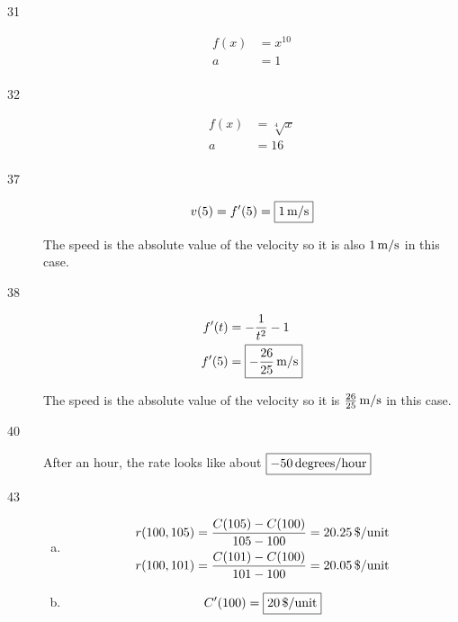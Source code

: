 \documentclass[letterpaper, landscape]{exam}
\begin{document}
\begin{description}
      \item[31]
        \begin{align*}
          f(x) & = x^{10} \\
          a    & = 1 \\
        \end{align*}

      \item[32]
        \begin{align*}
          f(x) & = \sqrt[4]{x} \\
          a    & = 16 \\
        \end{align*}

      \item[37]
        \[
          v(5) = f'(5) = \boxed{\unit[1]{m/s}} 
        \]

        The speed is the absolute value of the velocity so it is also $\unit[1]{m/s}$ in this case.

      \item[38]
        \begin{align*}
          f'(t) & = - \frac{1}{t^2} - 1 \\
          f'(5) & = \boxed{ \unit[ - \frac{26}{25} ]{m/s} }
        \end{align*}

        The speed is the absolute value of the velocity so it is $\unit[\frac{26}{25} ]{m/s}$ in this case.
 
      \item[40]
        After an hour, the rate looks like about $\boxed{ - \unit[50]{degrees/hour} }$

      \newpage

      \item[43]
        \begin{enumerate}[(a)]
          \item 
            \begin{align*}
              r(100, 105) &= \frac{ C(105) - C(100) }{ 105 - 100 } = \unit[20.25]{\$/unit} \\
              r(100, 101) &= \frac{ C(101) - C(100) }{ 101 - 100 } = \unit[20.05]{\$/unit} \\
            \end{align*}

          \item
            \[
              C'(100) = \boxed{ \unit[20]{\$/unit} }
            \]
        \end{enumerate}


\end{description}
\end{document}
